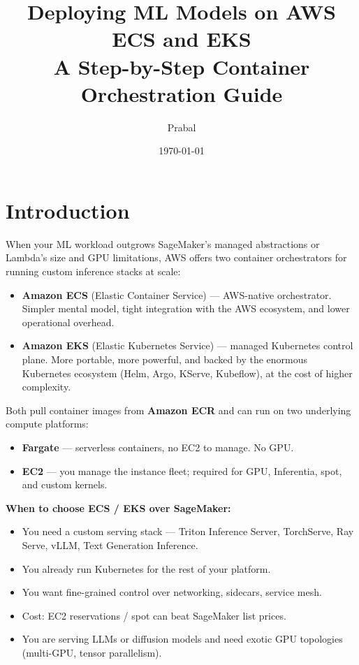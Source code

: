 \documentclass[11pt,a4paper]{article}
\title{\textbf{Deploying ML Models on AWS ECS and EKS}\\
\large A Step-by-Step Container Orchestration Guide}
\author{Prabal}
\date{\today}
\begin{document}
\maketitle
\tableofcontents
\newpage

\section{Introduction}

When your ML workload outgrows SageMaker's managed abstractions or Lambda's
size and GPU limitations, AWS offers two container orchestrators for running
custom inference stacks at scale:

\begin{itemize}[leftmargin=*]
    \item \textbf{Amazon ECS} (Elastic Container Service) --- AWS-native
          orchestrator. Simpler mental model, tight integration with the AWS
          ecosystem, and lower operational overhead.
    \item \textbf{Amazon EKS} (Elastic Kubernetes Service) --- managed
          Kubernetes control plane. More portable, more powerful, and backed by
          the enormous Kubernetes ecosystem (Helm, Argo, KServe, Kubeflow),
          at the cost of higher complexity.
\end{itemize}

Both pull container images from \textbf{Amazon ECR} and can run on two
underlying compute platforms:

\begin{itemize}[leftmargin=*,nosep]
    \item \textbf{Fargate} --- serverless containers, no EC2 to manage. No GPU.
    \item \textbf{EC2} --- you manage the instance fleet; required for GPU,
          Inferentia, spot, and custom kernels.
\end{itemize}

\begin{notebox}
\textbf{When to choose ECS / EKS over SageMaker:}
\begin{itemize}[leftmargin=*,nosep]
    \item You need a custom serving stack --- Triton Inference Server,
          TorchServe, Ray Serve, vLLM, Text Generation Inference.
    \item You already run Kubernetes for the rest of your platform.
    \item You want fine-grained control over networking, sidecars, service mesh.
    \item Cost: EC2 reservations / spot can beat SageMaker list prices.
    \item You are serving LLMs or diffusion models and need exotic GPU
          topologies (multi-GPU, tensor parallelism).
\end{itemize}
\end{notebox}
\end{document}
